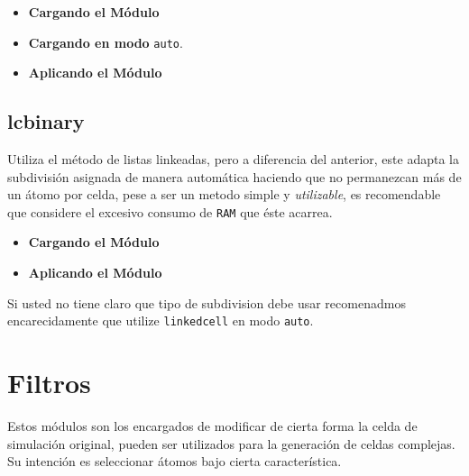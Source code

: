 \begin{itemize}
 \item \textbf{Cargando el M\'odulo}
 \item \textbf{Cargando en modo} \texttt{auto}.
 \item \textbf{Aplicando el M\'odulo}
\end{itemize}

\subsection{lcbinary}
Utiliza el m\'etodo de listas linkeadas, pero a diferencia del anterior, este adapta la subdivisi\'on asignada de manera autom\'atica haciendo que no permanezcan m\'as de un \'atomo por celda, pese a ser un metodo simple y \textit{utilizable}, es recomendable que considere el excesivo consumo de \verb|RAM| que \'este acarrea.

\begin{itemize}
 \item \textbf{Cargando el M\'odulo}
 \item \textbf{Aplicando el M\'odulo}
\end{itemize}

Si usted no tiene claro que tipo de subdivision debe usar recomenadmos encarecidamente que utilize \verb|linkedcell| en modo \verb|auto|.
\section{Filtros}
Estos m\'odulos son los encargados de modificar de cierta forma la celda de simulaci\'on original, pueden ser utilizados para la generaci\'on de celdas complejas. Su intenci\'on es seleccionar \'atomos bajo cierta caracter\'istica.

